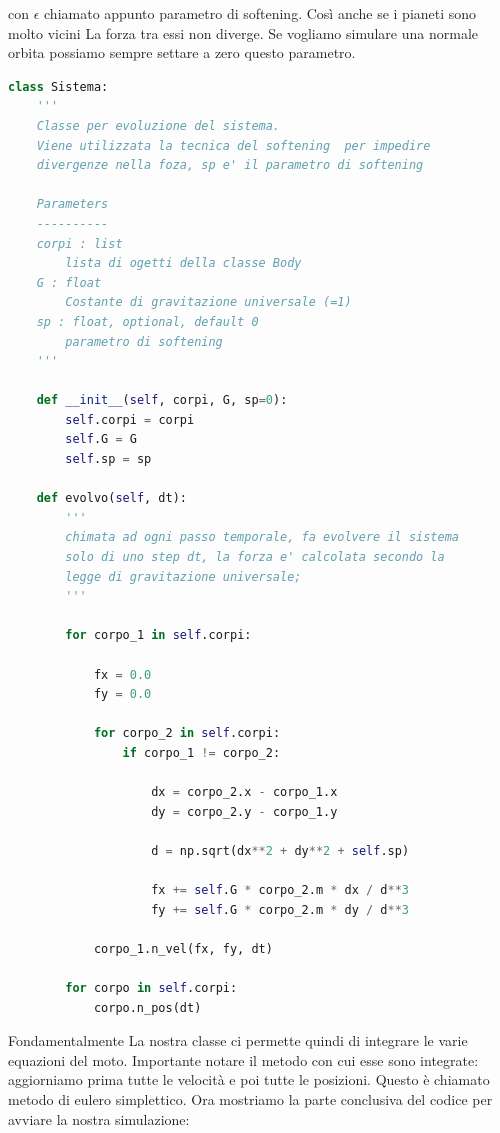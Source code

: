 \documentclass[10pt,a4paper]{article}
\begin{document}
con $\epsilon$ chiamato appunto parametro di softening. Così anche se i pianeti sono molto vicini La forza tra essi non diverge. Se vogliamo simulare una normale orbita possiamo sempre settare a zero questo parametro.
\begin{lstlisting}[language=Python]
class Sistema:
    '''
    Classe per evoluzione del sistema.
    Viene utilizzata la tecnica del softening  per impedire
    divergenze nella foza, sp e' il parametro di softening
    
    Parameters
    ----------
    corpi : list
        lista di ogetti della classe Body
    G : float
        Costante di gravitazione universale (=1)
    sp : float, optional, default 0
        parametro di softening
    '''

    def __init__(self, corpi, G, sp=0):
        self.corpi = corpi
        self.G = G
        self.sp = sp

    def evolvo(self, dt):
        '''
        chimata ad ogni passo temporale, fa evolvere il sistema
        solo di uno step dt, la forza e' calcolata secondo la
        legge di gravitazione universale;
        '''

        for corpo_1 in self.corpi:

            fx = 0.0
            fy = 0.0

            for corpo_2 in self.corpi:
                if corpo_1 != corpo_2:

                    dx = corpo_2.x - corpo_1.x
                    dy = corpo_2.y - corpo_1.y

                    d = np.sqrt(dx**2 + dy**2 + self.sp)

                    fx += self.G * corpo_2.m * dx / d**3
                    fy += self.G * corpo_2.m * dy / d**3

            corpo_1.n_vel(fx, fy, dt)

        for corpo in self.corpi:
            corpo.n_pos(dt)

\end{lstlisting}
Fondamentalmente La nostra classe ci permette quindi di integrare le varie equazioni del moto. Importante notare il metodo con cui esse sono integrate: aggiorniamo prima tutte le velocità e poi tutte le posizioni. Questo è chiamato metodo di eulero simplettico. Ora mostriamo la parte conclusiva del codice per avviare la nostra simulazione:
\end{document}
